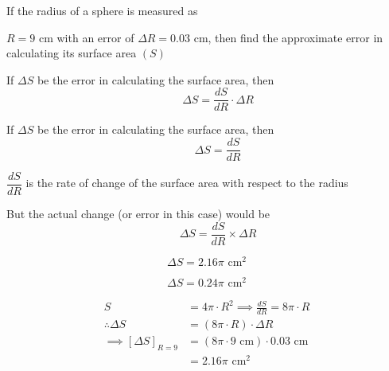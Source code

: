 \documentclass[14pt,fleqn]{extarticle}
\begin{document}
If the radius of a sphere is measured as 

$R=9$ cm with an error of $\Delta R=0.03$ cm, then find the 
approximate error in calculating its surface area $(S)$
%

\newcard

If $\Delta S$ be the error in calculating the surface area, then 
\[ \qquad \Delta S = \frac{dS}{dR}\cdot \Delta R \]

\newcard 

If $\Delta S$ be the error in calculating the surface area, then 
\[ \qquad \Delta S = \frac{dS}{dR}\]

\newcard 

$\dfrac{dS}{dR}$ is the rate of change of the surface area with respect to the radius\newline 

But the actual change (or error in this case) would be 
\[ \qquad \Delta S = \frac{dS}{dR}\times \Delta R \]

\newcard 

\[ \Delta S = 2.16\pi\text{ cm}^2 \]

\newcard 

\[ \Delta S = 0.24\pi\text{ cm}^2 \]

\newcard 

\begin{align}
S &= 4\pi\cdot R^2 \implies \frac{dS}{dR} = 8\pi\cdot R \\
\therefore \Delta S &= \left(8\pi\cdot R \right)\cdot \Delta R \\
\implies \left[\Delta S \right]_{R=9} &= \left(8\pi\cdot 9\text{ cm} \right)\cdot 0.03\text{ cm} \\
&= 2.16\pi\text{ cm}^2
\end{align}
\end{document}
